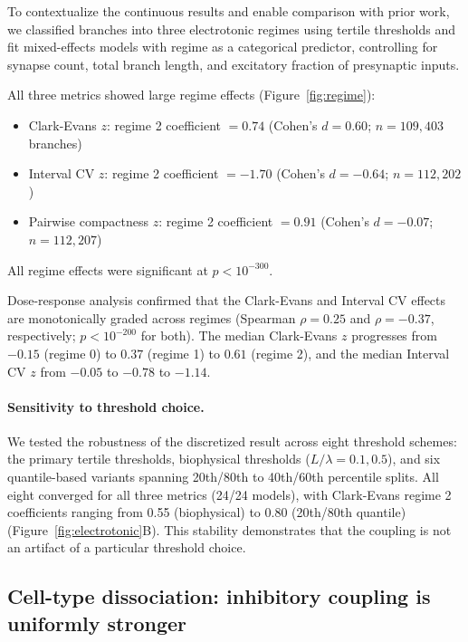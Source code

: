 \documentclass[11pt]{article}
\begin{document}
To contextualize the continuous results and enable comparison with prior work, we classified branches into three electrotonic regimes using tertile thresholds and fit mixed-effects models with regime as a categorical predictor, controlling for synapse count, total branch length, and excitatory fraction of presynaptic inputs.

All three metrics showed large regime effects (Figure~\ref{fig:regime}):
\begin{itemize}
    \item Clark-Evans $z$: regime 2 coefficient $= 0.74$ (Cohen's $d = 0.60$; $n = 109{,}403$ branches)
    \item Interval CV $z$: regime 2 coefficient $= -1.70$ (Cohen's $d = -0.64$; $n = 112{,}202$)
    \item Pairwise compactness $z$: regime 2 coefficient $= 0.91$ (Cohen's $d = -0.07$; $n = 112{,}207$)
\end{itemize}
All regime effects were significant at $p < 10^{-300}$.

Dose-response analysis confirmed that the Clark-Evans and Interval CV effects are monotonically graded across regimes (Spearman $\rho = 0.25$ and $\rho = -0.37$, respectively; $p < 10^{-200}$ for both). The median Clark-Evans $z$ progresses from $-0.15$ (regime 0) to $0.37$ (regime 1) to $0.61$ (regime 2), and the median Interval CV $z$ from $-0.05$ to $-0.78$ to $-1.14$.

\paragraph{Sensitivity to threshold choice.} We tested the robustness of the discretized result across eight threshold schemes: the primary tertile thresholds, biophysical thresholds ($L/\lambda = 0.1, 0.5$), and six quantile-based variants spanning 20th/80th to 40th/60th percentile splits. All eight converged for all three metrics (24/24 models), with Clark-Evans regime 2 coefficients ranging from 0.55 (biophysical) to 0.80 (20th/80th quantile) (Figure~\ref{fig:electrotonic}B). This stability demonstrates that the coupling is not an artifact of a particular threshold choice.


\subsection{Cell-type dissociation: inhibitory coupling is uniformly stronger}
\label{sec:celltype}
\end{document}
